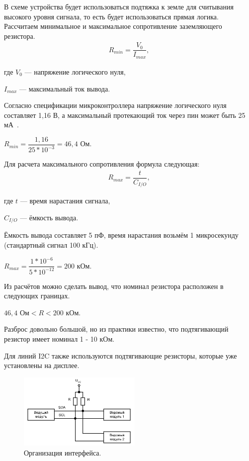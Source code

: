 	В схеме устройства будет использоваться подтяжка к земле для считывания высокого уровня сигнала, то есть будет использоваться прямая логика. Рассчитаем минимальное и максимальное сопротивление заземляющего резистора.
	\begin{gather}
	R_{min} = \dfrac{V_{0}}{I_{max}},
	\end{gather}
	
	где $V_{0}$ --- напряжение логического нуля,
	
	$I_{max}$ --- максимальный ток вывода.
	
	Согласно спецификации микроконтроллера напряжение логического нуля составляет 1,16 В, а максимальный протекающий ток через пин может быть 25 мА~\cite{f103}. 
	
\begin{center}
	$R_{min} = \dfrac{1,16}{25*10^{-3}} = 46,4$ Ом.
\end{center}

	Для расчета максимального сопротивления формула следующая:
	\begin{gather}
	R_{max} = \dfrac{t}{C_{I/O}},
	\end{gather}
	
	где $t$ --- время нарастания сигнала,
	
	$C_{I/O}$ --- ёмкость вывода.
	
	Ёмкость вывода составляет 5 пФ, время нарастания возьмём 1 микросекунду (стандартный сигнал 100 кГц).
	
\begin{center}
	$R_{max} = \dfrac{1*10^{-6}}{5*10^{-12}} = 200$ кОм.
\end{center}	

	Из расчётов можно сделать вывод, что номинал резистора расположен в следующих границах.
	
\begin{center}
	$46,4$ Ом$ < R < 200$ кОм.
\end{center}	

	Разброс довольно большой, но из практики известно, что подтягивающий резистор имеет номинал 1 - 10 кОм.
	
	Для линий I2C также используются подтягивающие резисторы, которые уже установлены на дисплее.
	
	\begin{figure}[H]
    \centering
    \includegraphics[width=0.525\textwidth]{../image/i2c.png}
    \caption{Организация интерфейса.}
	\end{figure}
	
